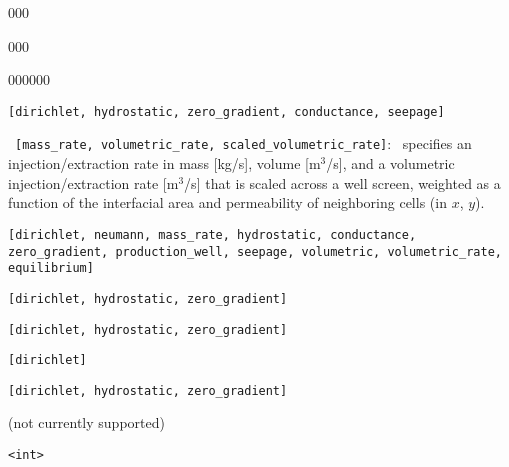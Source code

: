 \begin{deflist}{000}
\begin{deflist}{000}
\begin{deflist}{000000}
\item[PRESSURE] {\tt [dirichlet, hydrostatic, zero\_gradient, conductance,  \linebreak seepage]}
\item[RATE] \ {\tt [mass\_rate, volumetric\_rate, scaled\_volumetric\_rate]}: \ specifies an injection/extraction rate in mass [kg/s], volume [m$^3$/s], and a volumetric injection/extraction rate [m$^3$/s] that is scaled across a well screen, weighted as a function of the interfacial area and permeability of neighboring cells (in $x$, $y$).

\item[FLUX] {\tt [dirichlet, neumann, mass\_rate, hydrostatic, conductance,  \linebreak zero\_gradient, production\_well, seepage, volumetric, \linebreak volumetric\_rate, equilibrium]}
\item[TEMPERATURE] {\tt [dirichlet, hydrostatic, zero\_gradient]}
\item[CONCENTRATION] {\tt [dirichlet, hydrostatic, zero\_gradient]}
\item[SATURATION] {\tt [dirichlet]}
\item[ENTHALPY (H)] {\tt [dirichlet, hydrostatic, zero\_gradient]}
\end{deflist}
\item[\keyend]
\item[TIME] (not currently supported)

\item[IPHASE] {\tt <int>}


\end{deflist}
\end{deflist}
